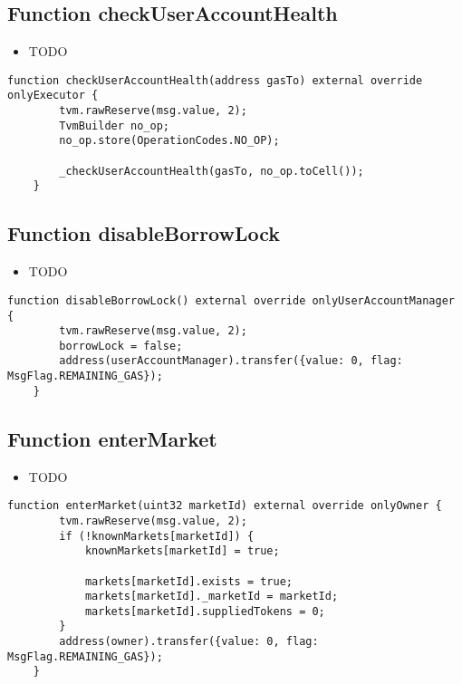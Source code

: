 \subsection{Function checkUserAccountHealth}

\noindent\begin{itemize}
\item TODO
\end{itemize}

\begin{lstlisting}[firstnumber=249]
    function checkUserAccountHealth(address gasTo) external override onlyExecutor {
        tvm.rawReserve(msg.value, 2);
        TvmBuilder no_op;
        no_op.store(OperationCodes.NO_OP);

        _checkUserAccountHealth(gasTo, no_op.toCell());
    }
\end{lstlisting}

\subsection{Function disableBorrowLock}

\noindent\begin{itemize}
\item TODO
\end{itemize}

\begin{lstlisting}[firstnumber=379]
    function disableBorrowLock() external override onlyUserAccountManager {
        tvm.rawReserve(msg.value, 2);
        borrowLock = false;
        address(userAccountManager).transfer({value: 0, flag: MsgFlag.REMAINING_GAS});
    }
\end{lstlisting}

\subsection{Function enterMarket}

\noindent\begin{itemize}
\item TODO
\end{itemize}

\begin{lstlisting}[firstnumber=391]
    function enterMarket(uint32 marketId) external override onlyOwner {
        tvm.rawReserve(msg.value, 2);
        if (!knownMarkets[marketId]) {
            knownMarkets[marketId] = true;

            markets[marketId].exists = true;
            markets[marketId]._marketId = marketId;
            markets[marketId].suppliedTokens = 0;
        }
        address(owner).transfer({value: 0, flag: MsgFlag.REMAINING_GAS});
    }
\end{lstlisting}

